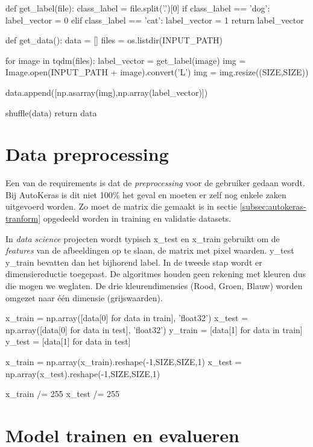\begin{python}
def get_label(file):
    class_label = file.split('.')[0]
    if class_label == 'dog': label_vector = 0
    elif class_label == 'cat': label_vector = 1
    return label_vector
    
def get_data():
    data = []
    files = os.listdir(INPUT_PATH)
    
    for image in tqdm(files):
        label_vector = get_label(image)
        img = Image.open(INPUT_PATH + image).convert('L')
        img = img.resize((SIZE,SIZE))
    
        data.append([np.asarray(img),np.array(label_vector)])
        
    shuffle(data)
    return data

\end{python}

\section{Data preprocessing}
\label{sec:preprocessing-autokeras}

Een van de requirements is dat de \textit{preprocessing} voor de gebruiker gedaan wordt. Bij AutoKeras is dit niet 100\% het geval en moeten er zelf nog enkele zaken uitgevoerd worden. Zo moet de matrix die gemaakt is in sectie \ref{subsec:autokeras-tranform} opgedeeld worden in training en validatie datasets.

In \textit{data science} projecten wordt typisch x\_test en x\_train gebruikt om de \textit{features} van de afbeeldingen op te slaan, de matrix met pixel waarden. y\_test y\_train bevatten dan het bijhorend label. In de tweede stap wordt er dimensiereductie toegepast. De algoritmes houden geen rekening met kleuren dus die mogen we weglaten. De drie kleurendimensies (Rood, Groen, Blauw) worden omgezet naar één dimensie (grijswaarden).

\bigskip

\begin{python}
x_train = np.array([data[0] for data in train], 'float32')
x_test = np.array([data[0] for data in test], 'float32')
y_train = [data[1] for data in train]
y_test = [data[1] for data in test]

x_train = np.array(x_train).reshape(-1,SIZE,SIZE,1)
x_test = np.array(x_test).reshape(-1,SIZE,SIZE,1)

x_train /= 255
x_test /= 255
\end{python}

\section{Model trainen en evalueren}
\label{sec:traineval-autokeras}

